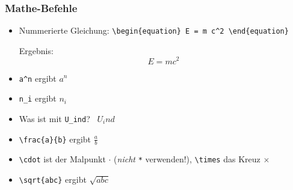 \begin{frame}[<+->][fragile]
	\frametitle{Mathe-Befehle}
	
	\begin{itemize}
		\item Nummerierte Gleichung: \lstinline!\begin{equation} E = m c^2 \end{equation}!

		Ergebnis:
		\begin{equation}
			E = m c^2
		\end{equation}
		\item \lstinline!a^n! ergibt $a^n$
		\item \lstinline!n_i! ergibt $n_i$
		\item Was ist mit \lstinline!U_ind!? \textrightarrow\ $U_ind$
		\item \lstinline!\frac{a}{b}! ergibt $\displaystyle\frac{a}{b}$
		\item \lstinline!\cdot! ist der Malpunkt $\cdot$ (\emph{nicht} \lstinline!*! verwenden!), \lstinline!\times! das Kreuz $\times$
		\item \lstinline!\sqrt{abc}! ergibt $\sqrt{abc}$
	\end{itemize}
\end{frame}

